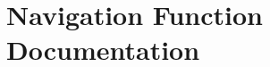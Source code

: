 \documentclass[main.tex]{subfiles}
\begin{document}
	\begingroup

	\renewcommand{\cleardoublepage}{}

	\renewcommand{\clearpage}{}

	\chapter{Navigation Function Documentation}

		\chapterauthor{}
		

	\endgroup
\end{document}
